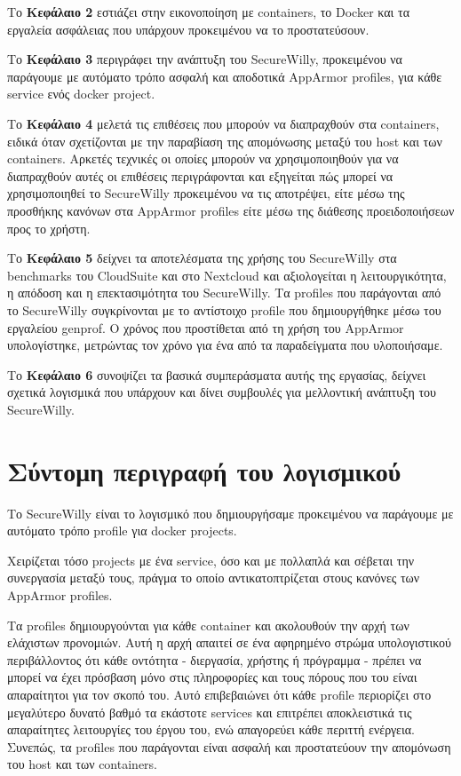 Το \textbf{Κεφάλαιο 2} εστιάζει στην εικονοποίηση με \en containers\gr{}, το \en Docker\gr{} και τα εργαλεία ασφάλειας που υπάρχουν προκειμένου να το προστατεύσουν. 

Το \textbf{Κεφάλαιο 3} περιγράφει την ανάπτυξη του \en SecureWilly\gr{}, προκειμένου να παράγουμε με αυτόματο τρόπο ασφαλή και αποδοτικά \en AppArmor profiles\gr{}, για κάθε \en service\gr{} ενός \en docker project\gr. 

Το \textbf{Κεφάλαιο 4} μελετά τις επιθέσεις που μπορούν να διαπραχθούν στα \en containers\gr{}, ειδικά όταν σχετίζονται με την παραβίαση της απομόνωσης μεταξύ του \en host\gr{} και των \en containers\gr{}. Αρκετές τεχνικές οι οποίες μπορούν να χρησιμοποιηθούν για να διαπραχθούν αυτές οι επιθέσεις περιγράφονται και εξηγείται πώς μπορεί να χρησιμοποιηθεί το \en SecureWilly\gr{} προκειμένου να τις αποτρέψει, είτε μέσω της προσθήκης κανόνων στα \en AppArmor profiles\gr{} είτε μέσω της διάθεσης προειδοποιήσεων προς το χρήστη.

Το \textbf{Κεφάλαιο 5} δείχνει τα αποτελέσματα της χρήσης του \en SecureWilly\gr{} στα \en benchmarks\gr{} του \en CloudSuite\gr{} και στο \en Nextcloud\gr{} και αξιολογείται η λειτουργικότητα, η απόδοση και η επεκτασιμότητα του \en SecureWilly\gr{}. Τα \en profiles\gr{} που παράγονται από το \en SecureWilly\gr{} συγκρίνονται με το αντίστοιχο \en profile\gr{} που δημιουργήθηκε μέσω του εργαλείου \en genprof\gr{}. Ο χρόνος που προστίθεται από τη χρήση του \en AppArmor\gr{} υπολογίστηκε, μετρώντας τον χρόνο για ένα από τα παραδείγματα που υλοποιήσαμε.

Το \textbf{Κεφάλαιο 6} συνοψίζει τα βασικά συμπεράσματα αυτής της εργασίας, δείχνει σχετικά λογισμικά που υπάρχουν και δίνει συμβουλές για μελλοντική ανάπτυξη του \en SecureWilly\gr{}.

\section*{Σύντομη περιγραφή του λογισμικού}
Το \en SecureWilly\gr{} είναι το λογισμικό που δημιουργήσαμε προκειμένου να παράγουμε με αυτόματο τρόπο \en profile\gr{} για \en docker projects\gr{}.

Χειρίζεται τόσο \en projects\gr{} με ένα \en service\gr{}, όσο και με πολλαπλά και σέβεται την συνεργασία μεταξύ τους, πράγμα το οποίο αντικατοπτρίζεται στους κανόνες των \en AppArmor profiles\gr{}.

Τα \en profiles\gr{} δημιουργούνται για κάθε \en container\gr{} και ακολουθούν την αρχή των ελάχιστων προνομιών. Αυτή η αρχή απαιτεί σε ένα αφηρημένο στρώμα υπολογιστικού περιβάλλοντος ότι κάθε οντότητα - διεργασία, χρήστης ή πρόγραμμα - πρέπει να μπορεί να έχει πρόσβαση μόνο στις πληροφορίες και τους πόρους που του είναι απαραίτητοι για τον σκοπό του. Αυτό επιβεβαιώνει ότι κάθε \en profile\gr{} περιορίζει στο μεγαλύτερο δυνατό βαθμό τα εκάστοτε \en services\gr{} και επιτρέπει αποκλειστικά τις απαραίτητες λειτουργίες του έργου του, ενώ απαγορεύει κάθε περιττή ενέργεια. Συνεπώς, τα \en profiles\gr{} που παράγονται είναι ασφαλή και προστατεύουν την απομόνωση του \en host\gr{} και των \en containers\gr{}.

